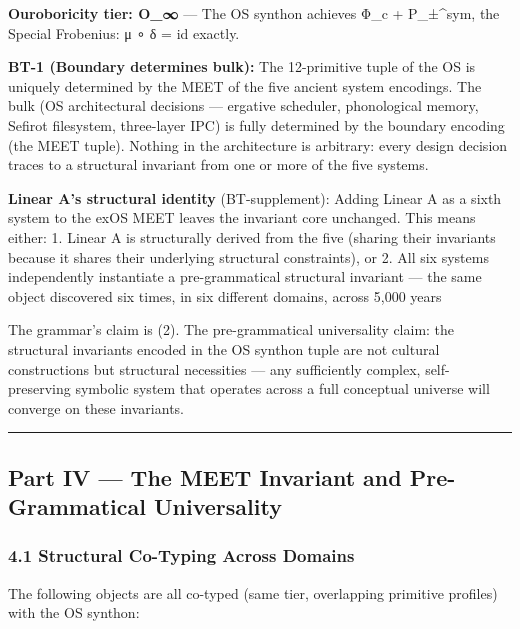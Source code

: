 \documentclass[
  11pt,
  a4paper,
]{article}
\begin{document}
\textbf{Ouroboricity tier: O\_∞} --- The OS synthon achieves Φ\_c +
P\_±\^{}sym, the Special Frobenius: μ ∘ δ = id exactly.

\textbf{BT-1 (Boundary determines bulk):} The 12-primitive tuple of the
OS is uniquely determined by the MEET of the five ancient system
encodings. The bulk (OS architectural decisions --- ergative scheduler,
phonological memory, Sefirot filesystem, three-layer IPC) is fully
determined by the boundary encoding (the MEET tuple). Nothing in the
architecture is arbitrary: every design decision traces to a structural
invariant from one or more of the five systems.

\textbf{Linear A's structural identity} (BT-supplement): Adding Linear A
as a sixth system to the exOS MEET leaves the invariant core unchanged.
This means either: 1. Linear A is structurally derived from the five
(sharing their invariants because it shares their underlying structural
constraints), or 2. All six systems independently instantiate a
pre-grammatical structural invariant --- the same object discovered six
times, in six different domains, across 5,000 years

The grammar's claim is (2). The pre-grammatical universality claim: the
structural invariants encoded in the OS synthon tuple are not cultural
constructions but structural necessities --- any sufficiently complex,
self-preserving symbolic system that operates across a full conceptual
universe will converge on these invariants.

\begin{center}\rule{0.5\linewidth}{0.5pt}\end{center}

\subsection{Part IV --- The MEET Invariant and Pre-Grammatical
Universality}\label{part-iv-the-meet-invariant-and-pre-grammatical-universality}

\subsubsection{4.1 Structural Co-Typing Across
Domains}\label{structural-co-typing-across-domains}

The following objects are all co-typed (same tier, overlapping primitive
profiles) with the OS synthon:
\end{document}
